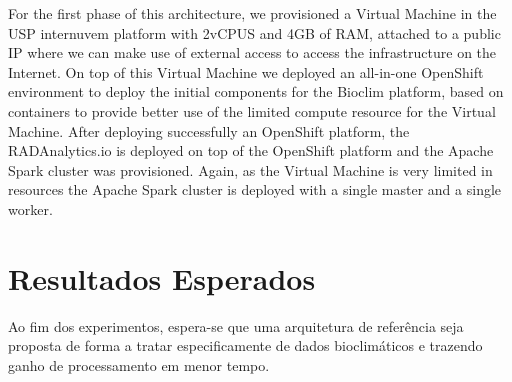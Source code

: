 \documentclass[conference]{IEEEtran}
\begin{document}
For the first phase of this architecture, we provisioned a Virtual Machine in the USP internuvem platform with 2vCPUS and 4GB of RAM, attached to a public IP where we can make use of external access to access the infrastructure on the Internet. On top of this Virtual Machine we deployed an all-in-one OpenShift environment to deploy the initial components for the Bioclim platform, based on containers to provide better use of the limited compute resource for the Virtual Machine. After deploying successfully an OpenShift platform, the RADAnalytics.io is deployed on top of the OpenShift platform and the Apache Spark cluster was provisioned. Again, as the Virtual Machine is very limited in resources the Apache Spark cluster is deployed with a single master and a single worker.


\section{Resultados Esperados}

Ao fim dos experimentos, espera-se que uma arquitetura de refer\^{e}ncia seja proposta de forma a tratar especificamente de dados bioclim\'{a}ticos e trazendo ganho de processamento em menor tempo.



\end{document}
